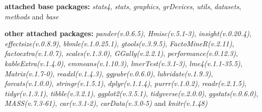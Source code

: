 \documentclass[
  bookmarksnumbered]{article}
\begin{document}
\textbf{attached base packages:}
\emph{stats4}, \emph{stats}, \emph{graphics}, \emph{grDevices}, \emph{utils}, \emph{datasets}, \emph{methods} and \emph{base}

\textbf{other attached packages:}
\emph{pander(v.0.6.5)}, \emph{Hmisc(v.5.1-3)}, \emph{insight(v.0.20.4)}, \emph{effectsize(v.0.8.9)}, \emph{bbmle(v.1.0.25.1)}, \emph{gtools(v.3.9.5)}, \emph{FactoMineR(v.2.11)}, \emph{factoextra(v.1.0.7)}, \emph{scales(v.1.3.0)}, \emph{GGally(v.2.2.1)}, \emph{performance(v.0.12.3)}, \emph{kableExtra(v.1.4.0)}, \emph{emmeans(v.1.10.3)}, \emph{lmerTest(v.3.1-3)}, \emph{lme4(v.1.1-35.5)}, \emph{Matrix(v.1.7-0)}, \emph{readxl(v.1.4.3)}, \emph{ggpubr(v.0.6.0)}, \emph{lubridate(v.1.9.3)}, \emph{forcats(v.1.0.0)}, \emph{stringr(v.1.5.1)}, \emph{dplyr(v.1.1.4)}, \emph{purrr(v.1.0.2)}, \emph{readr(v.2.1.5)}, \emph{tidyr(v.1.3.1)}, \emph{tibble(v.3.2.1)}, \emph{ggplot2(v.3.5.1)}, \emph{tidyverse(v.2.0.0)}, \emph{ggstats(v.0.6.0)}, \emph{MASS(v.7.3-61)}, \emph{car(v.3.1-2)}, \emph{carData(v.3.0-5)} and \emph{knitr(v.1.48)}
\end{document}
